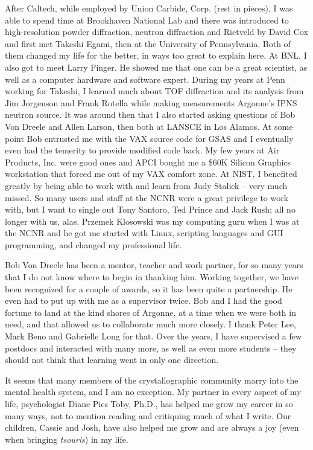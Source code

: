 After Caltech, while employed by Union Carbide, Corp. (rest in pieces), I was able to spend time at Brookhaven National Lab and there was introduced to high-resolution powder diffraction, neutron diffraction and Rietveld by David Cox and first met Takeshi Egami, then at the University of Pennsylvania. Both of them changed my life for the better, in ways too great to explain here. At BNL, I also got to meet Larry Finger. He showed me that one can be a great scientist, as well as a computer hardware and software expert. During my years at Penn working for Takeshi, I learned much about TOF diffraction and its analysis from Jim Jorgenson and Frank Rotella while making measurements Argonne's IPNS neutron source. It was around then that I also started asking questions of Bob Von Dreele and Allen Larson, then both at LANSCE in Los Alamos. At some point Bob entrusted me with the VAX source code for GSAS and I eventually even had the temerity to provide modified code back. My few years at Air Products, Inc. were good ones and APCI bought me a \$60K Silicon Graphics workstation that forced me out of my VAX comfort zone. At NIST, I benefited greatly by being able to work with and learn from Judy Stalick -- very much missed. So many users and staff at the NCNR were a great privilege to work with, but I want to single out Tony Santoro, Ted Prince and Jack Rush; all no longer with us, alas. Przemek Klosowski was my computing guru when I was at the NCNR and he got me started with Linux, scripting languages and GUI programming, and changed my professional life.

Bob Von Dreele has been a mentor, teacher and work partner, for so many years that I do not know where to begin in thanking him. Working together, we have been recognized for a couple of awards, so it has been quite a partnership. He even had to put up with me as a supervisor twice.
Bob and I had the good fortune to land at the kind shores of Argonne, at a time when we were both in need, and that allowed us to collaborate much more closely. I thank Peter Lee, Mark Beno and Gabrielle Long for that. Over the years, I have supervised a few postdocs and interacted with many more, as well as even more students -- they should not think that learning went in only one direction. 

It seems that many members of the crystallographic community marry into the mental health system, and I am no exception. My partner in every aspect of my life, psychologist Diane Pies Toby, Ph.D., has helped me grow my career in so many ways, not to mention reading and critiquing much of what I write. Our children, Cassie and Josh, have also helped me grow and are always a joy (even when bringing \textit{tsouris}) in my life.

